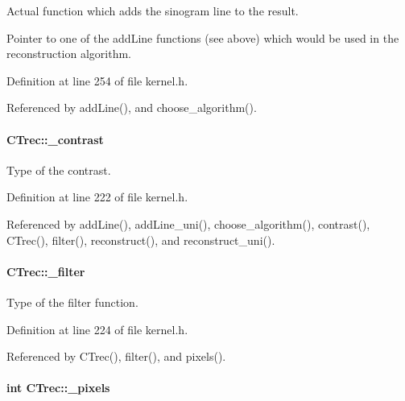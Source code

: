 Actual function which adds the sinogram line to the result. 

Pointer to one of the addLine functions (see above) which would be used in the reconstruction algorithm. 

Definition at line 254 of file kernel.h.



Referenced by addLine(), and choose\_\-algorithm().

\hypertarget{classCTrec_a4a2c0cea76273f93c7bd69d10b090c1a}{
\paragraph[{\_\-contrast}]{ {\bf CTrec::\_\-contrast}}\hfill}
\label{classCTrec_a4a2c0cea76273f93c7bd69d10b090c1a}


Type of the contrast. 



Definition at line 222 of file kernel.h.



Referenced by addLine(), addLine\_\-uni(), choose\_\-algorithm(), contrast(), CTrec(), filter(), reconstruct(), and reconstruct\_\-uni().

\hypertarget{classCTrec_a57ae11bb07c6d1015eab118a8e68cc7f}{
\paragraph[{\_\-filter}]{ {\bf CTrec::\_\-filter}}\hfill}
\label{classCTrec_a57ae11bb07c6d1015eab118a8e68cc7f}


Type of the filter function. 



Definition at line 224 of file kernel.h.



Referenced by CTrec(), filter(), and pixels().

\hypertarget{classCTrec_a91849845389f46350ac0bc79e2e43486}{
\paragraph[{\_\-pixels}]{\setlength{\rightskip}{0pt plus 5cm}int {\bf CTrec::\_\-pixels}}\hfill}
\label{classCTrec_a91849845389f46350ac0bc79e2e43486}


